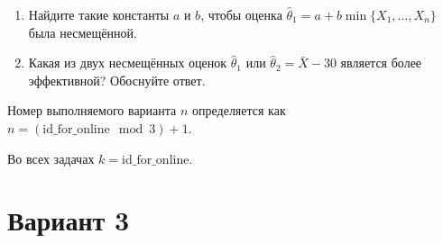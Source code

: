 \documentclass[12pt]{article}
\newcommand \id {\mathrm{id}\_\mathrm{for}\_\mathrm{online}}
\begin{document}
\begin{enumerate}
\begin{enumerate}
\item Найдите такие константы $a$ и $b$, чтобы оценка  $\hat \theta_1 = a + b\min\{X_1, \ldots, X_n\}$ была несмещённой.
\item Какая из двух несмещённых оценок $\hat \theta_1$ или $\hat \theta_2 = \bar X - 30$ является более эффективной? Обоснуйте ответ.
\end{enumerate}

\end{enumerate}

\newpage
Номер выполняемого варианта $n$ определяется как $n=(\id \mod 3)+1$. 

Во всех задачах $k=\id$.


\section*{Вариант 3}
\end{document}

